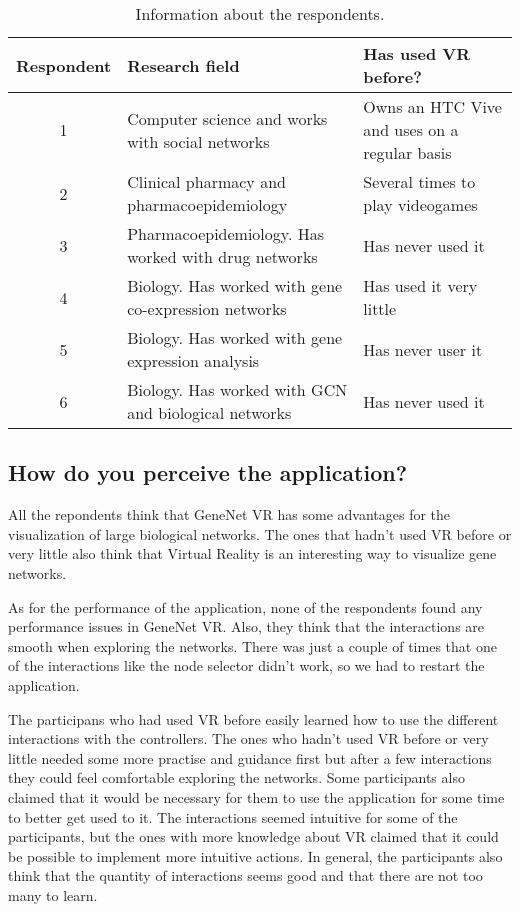 \begin{table}[h!]
\centering
\begin{tabularx}{\textwidth}{c X X}
\hline
Respondent & Research field & Has used VR before? \\
\hline
1 & Computer science and works with social networks  & Owns an HTC Vive and uses on a regular basis \\
2 & Clinical pharmacy and pharmacoepidemiology & Several times to play videogames \\
3 & Pharmacoepidemiology. Has worked with drug networks & Has never used it \\
4 & Biology. Has worked with gene co-expression networks & Has used it very little \\
5 & Biology. Has worked with gene expression analysis & Has never user it \\
6 & Biology. Has worked with GCN and biological networks & Has never used it \\
\hline
\end{tabularx}
\caption{Information about the respondents.}
\label{tab:respondents}
\end{table}

\subsection{How do you perceive the application?}
All the repondents think that GeneNet VR has some advantages for the visualization of large biological networks. The ones that hadn't used VR before or very little also think that Virtual Reality is an interesting way to visualize gene networks.

As for the performance of the application, none of the respondents found any performance issues in GeneNet VR. Also, they think that the interactions are smooth when exploring the networks. There was just a couple of times that one of the interactions like the node selector didn't work, so we had to restart the application.

The participans who had used VR before easily learned how to use the different interactions with the controllers. The ones who hadn't used VR before or very little needed some more practise and guidance first but after a few interactions they could feel comfortable exploring the networks. Some participants also claimed that it would be necessary for them to use the application for some time to better get used to it. The interactions seemed intuitive for some of the participants, but the ones with more knowledge about VR claimed that it could be possible to implement more intuitive actions. In general, the participants also think that the quantity of interactions seems good and that there are not too many to learn.

